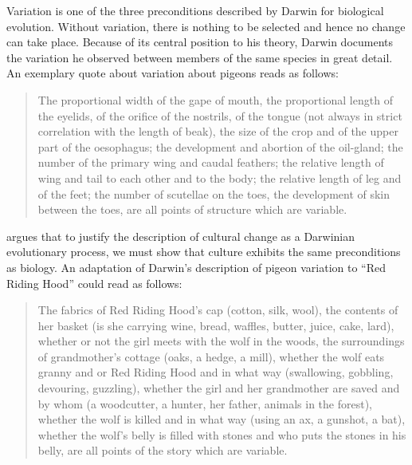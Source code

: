 Variation is one of the three preconditions described by Darwin for biological evolution. Without variation, there is nothing to be selected and hence no change can take place. Because of its central position to his theory, Darwin documents the variation he observed between members of the same species in great detail. An exemplary quote about variation about pigeons reads as follows:
\begin{quote}
    The proportional width of the gape of mouth, the proportional length of the eyelids, of the orifice of the nostrils, of the tongue (not always in strict correlation with the length of beak), the size of the crop and of the upper part of the oesophagus; the development and abortion of the oil-gland; the number of the primary wing and caudal feathers; the relative length of wing and tail to each other and to the body; the relative length of leg and of the feet; the number of scutellae on the toes, the development of skin between the toes, are all points of structure which are variable.\autocite[Darwin \emph{The Origin of Species}, cited in][27]{mesoudi:2011}
\end{quote}
\citeauthor{mesoudi:2011} argues that to justify the description of cultural change as a Darwinian evolutionary process, we must show that culture exhibits the same preconditions as biology\autocite[27--34]{mesoudi:2011}. An adaptation of Darwin's description of pigeon variation to ``Red Riding Hood'' could read as follows:
\begin{quote}
    The fabrics of Red Riding Hood's cap (cotton, silk, wool), the contents of her basket (is she carrying wine, bread, waffles, butter, juice, cake, lard), whether or not the girl meets with the wolf in the woods, the surroundings of grandmother's cottage (oaks, a hedge, a mill), whether the wolf eats granny and or Red Riding Hood and in what way (swallowing, gobbling, devouring, guzzling), whether the girl and her grandmother are saved and by whom (a woodcutter, a hunter, her father, animals in the forest), whether the wolf is killed and in what way (using an ax, a gunshot, a bat), whether the wolf's belly is filled with stones and who puts the stones in his belly, are all points of the story which are variable.
\end{quote}
